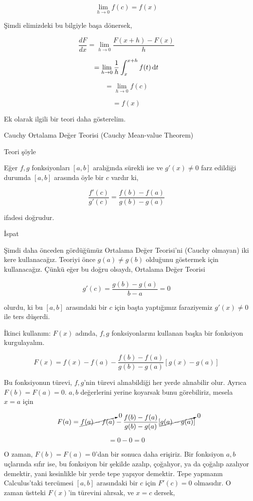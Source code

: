 \documentclass[12pt,fleqn]{article}\usepackage{../../common}
\begin{document}
$$ \lim_{h \to 0} f(c) = f(x) $$

Şimdi elimizdeki bu bilgiyle başa dönersek, 

$$ \frac{dF}{dx} = \lim_{h \to 0} \frac{F(x+h)-F(x)}{h} $$

$$  = \lim_{h \to 0} \frac{1}{h} \int_x^{x+h} f(t) \,\mathrm{d} t   $$

$$ = \lim_{h \to 0} f(c) $$

$$ = f(x) $$

Ek olarak ilgili bir teori daha gösterelim.

Cauchy Ortalama Değer Teorisi (Cauchy Mean-value Theorem)

Teori şöyle

Eğer $f,g$ fonksiyonları $[a,b]$ aralığında sürekli ise ve $g'(x) \ne 0$
farz edildiği durumda $[a,b]$ arasında öyle bir $c$ vardır ki,

$$ \frac{f'(c)}{g'(c)} = \frac{f(b)-f(a)}{g(b)-g(a)} $$

ifadesi doğrudur. 

İspat

Şimdi daha önceden gördüğümüz Ortalama Değer Teorisi'ni (Cauchy olmayan)
iki kere kullanacağız. Teoriyi önce $g(a) \ne g(b)$ olduğunu göstermek için
kullanacağız. Çünkü eğer bu doğru olsaydı, Ortalama Değer Teorisi 

$$ g'(c) = \frac{g(b) - g(a)}{b-a} = 0$$

olurdu, ki bu $[a,b]$ arasındaki bir $c$ için başta yaptığımız faraziyemiz
$g'(x) \ne 0$ ile ters düşerdi. 

İkinci kullanım: $F(x)$ adında, $f,g$ fonksiyonlarını kullanan başka bir
fonksiyon kurgulayalım.

$$ F(x) = f(x) - f(a) - \frac{f(b)-f(a) }{g(b)-g(a)}[g(x)-g(a)] $$

Bu fonksiyonun türevi, $f,g$'nin türevi alınabildiği her yerde alınabilir
olur. Ayrıca $F(b) = F(a) = 0$. $a,b$ değerlerini yerine koyarsak bunu
görebiliriz, mesela $x=a$ için

$$ F(a) = \cancelto{0}{f(a) - f(a)} -
\frac{f(b)-f(a) }{g(b)-g(a)}
[\cancelto{0}{g(a)-g(a)}] 
$$

$$  = 0 - 0 = 0 $$

O zaman, $F(b) = F(a) = 0$'dan bir sonuca daha erişiriz. Bir fonksiyon
$a,b$ uçlarında sıfır ise, bu fonksiyon bir şekilde azalıp, çoğalıyor, ya
da çoğalıp azalıyor demektir, yani kesinlikle bir yerde tepe yapıyor
demektir. Tepe yapmanın Calculus'taki tercümesi $[a,b]$ arasındaki bir $c$
için $F'(c)=0$ olmasıdır. O zaman üstteki $F(x)$'in türevini alırsak, ve
$x=c$ dersek, 
\end{document}
